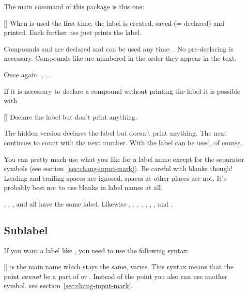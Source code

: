\documentclass[load-preamble+,babel-options={ngerman,british,american}]{cnltx-doc}
\begin{document}
The main command of this package is this one:
\begin{commands}
  []
    When  is used the first time, the label is created,
    saved (= declared) and printed.  Each further use just prints the label.
\end{commands}

\begin{example}
  Compounds  and  are declared and can be used any time:
  .  No pre-declaring is necessary.  Compounds like  are
  numbered in the order they appear in the text.\par
  Once again: , , .
\end{example}

If it is necessary to declare a compound without printing the label it is
possible with
\begin{commands}
  [\sarg{}]
    Declare the label but don't print anything.
\end{commands}

\begin{example}
  The hidden version declares the label but doesn't print anything.
  The next  continues to count with the next number.  With 
  the label can be used, of course.
\end{example}

You can pretty much use what you like for a label name except for the
separator symbols (see section~\ref{sec:chang-input-mark}).  Be careful with
blanks though!  Leading and trailing spaces are ignored, spaces at other
places are not.  It's probably best not to use blanks in label names at all.

\begin{example}[add-sourcecode-options={showspaces=true}]
  , , , and  all have the same label.
  Likewise , , , , ,
  , , and .
\end{example}

\subsection{Sublabel}\label{sec:sublabel}
If you want a label like , you need to use the following syntax:
\begin{commands}
  []
     is the main name which stays the same,  varies.  This syntax means that the point 
    \emph{cannot} be a part of  or .
    Instead of the point you also can use another symbol, see
    section~\ref{sec:chang-input-mark}.
\end{commands}
\end{document}
